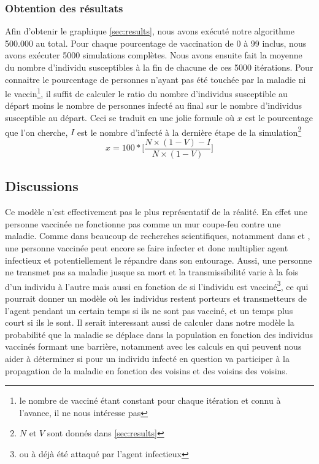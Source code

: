 \documentclass[10pt]{article}
\begin{document}
\subsubsection{Obtention des résultats}
Afin d'obtenir le graphique \ref{sec:results}, nous avons exécuté notre algorithme 500.000 au total. Pour chaque pourcentage de vaccination de 0 à 99 inclus, nous avons exécuter 5000 simulations complètes. Nous avons ensuite fait la moyenne du nombre d'individu susceptibles à la fin de chacune de ces 5000 itérations.
Pour connaitre le pourcentage de personnes n'ayant pas été touchée par la maladie ni le vaccin\footnote{le nombre de vacciné étant constant pour chaque itération et connu à l'avance, il ne nous intéresse pas}, il suffit de calculer le ratio du nombre d'individus susceptible au départ moins le nombre de personnes infecté au final sur le nombre d'individus susceptible au départ. Ceci se traduit en une jolie formule où $x$ est le pourcentage que l'on cherche, $I$ est le nombre d'infecté à la dernière étape de la simulation\footnote{$N$ et $V$ sont donnés dans \ref{sec:results} } $$x =  100*\Bigg[\frac{N\times(1-V)-I}{N \times (1-V)}\Bigg]$$


\subsection{Discussions}
\label{sec:discussions}
Ce modèle n'est effectivement pas le plus représentatif de la réalité. En effet une personne vaccinée ne fonctionne pas comme un mur coupe-feu contre une maladie. Comme dans beaucoup de recherches scientifiques, notamment dans \cite{Experimental infection of bacteria} et \cite{vaccine-induced reduction in virus transmission}, une personne vaccinée peut encore se faire infecter et donc multiplier agent infectieux et potentiellement le répandre dans son entourage. Aussi, une personne ne transmet pas sa maladie jusque sa mort et la transmissibilité varie à la fois d'un individu à l'autre mais aussi en fonction de si l'individu est vacciné\footnote{ou à déjà été attaqué par l'agent infectieux}, ce qui pourrait donner un modèle où les individus restent porteurs et transmetteurs de l'agent pendant un certain temps si ils ne sont pas vacciné, et un temps plus court si ils le sont.
Il serait interessant aussi de calculer dans notre modèle la probabilité que la maladie se déplace dans la population en fonction des individus vaccinés formant une barrière, notamment avec les calculs en \cite{sec:kvoisinsvac} qui peuvent nous aider à déterminer si pour un individu infecté en question va participer à la propagation de la maladie en fonction des voisins et des voisins des voisins.
\end{document}
